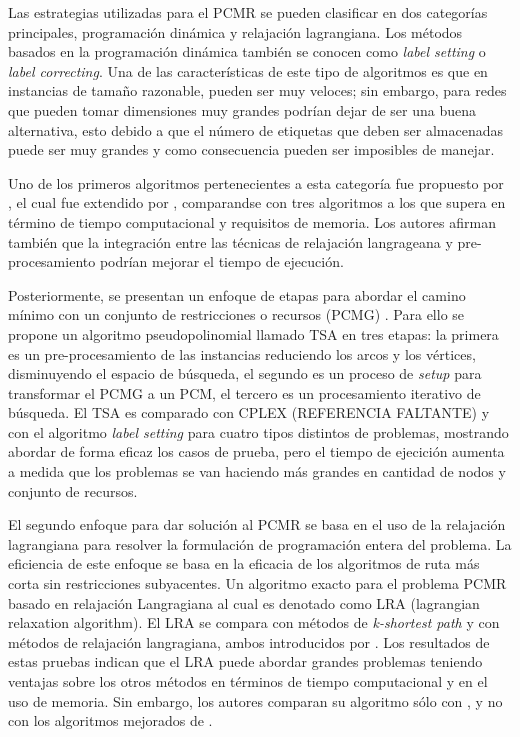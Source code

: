 Las estrategias utilizadas para el PCMR se pueden clasificar en dos categorías principales, programación dinámica y relajación lagrangiana. Los métodos basados en la programación dinámica también se conocen como \textit{label setting} o \textit{label correcting}. Una de las características de este tipo de algoritmos es que en instancias de tamaño razonable, pueden ser muy veloces; sin embargo, para redes que pueden tomar dimensiones muy grandes podrían dejar de ser una buena alternativa, esto debido a que el número de etiquetas que deben ser almacenadas  puede ser muy grandes y como consecuencia pueden ser imposibles de manejar.

Uno de los primeros algoritmos pertenecientes a esta categoría fue propuesto por \cite{joksch1966shortest}, el cual fue extendido por \cite{dumitrescu2003improved}, comparandse con tres algoritmos \cite{dumitrescu2001algorithms,hassin1992approximation,lorenz2001simple} a los que supera en término de tiempo computacional y requisitos de memoria. Los autores afirman también que la integración entre las técnicas de relajación langrageana y pre-procesamiento podrían mejorar el tiempo de ejecución.

Posteriormente, se presentan un enfoque de etapas para abordar el camino mínimo con un conjunto de restricciones o recursos (PCMG) \cite{zhu2012three}. Para ello se propone un algoritmo pseudopolinomial llamado TSA en tres etapas: la primera es un pre-procesamiento de las instancias reduciendo los arcos y los vértices, disminuyendo el espacio de búsqueda, el segundo es un proceso de \textit{setup} para transformar el PCMG a un PCM, el tercero es un procesamiento iterativo de búsqueda. El TSA es comparado con CPLEX (REFERENCIA FALTANTE) y con el algoritmo \textit{label setting} \citep{dumitrescu2003improved} para cuatro tipos distintos de problemas, mostrando abordar de forma eficaz los casos de prueba, pero el tiempo de ejecición aumenta a medida que los problemas se van haciendo más grandes en cantidad de nodos y conjunto de recursos.

El segundo enfoque para dar solución al PCMR se basa en el uso de la relajación lagrangiana para resolver la formulación de programación entera del problema. La eficiencia de este enfoque se basa en la eficacia de los algoritmos de ruta más corta sin restricciones subyacentes. Un algoritmo exacto para el problema PCMR basado en relajación Langragiana al cual es denotado como LRA (lagrangian relaxation algorithm)\citep{santos2007improved}. El LRA se compara con métodos de \textit{k-shortest path} y con métodos de relajación langragiana, ambos introducidos por \cite{handler1980dual}. Los resultados de estas pruebas indican que el LRA puede abordar grandes problemas teniendo ventajas sobre los otros métodos en términos de tiempo computacional y en el uso de memoria. Sin embargo, los autores comparan su algoritmo sólo con \cite{handler1980dual}, y no con los algoritmos mejorados de \citep{dumitrescu2003improved}.

